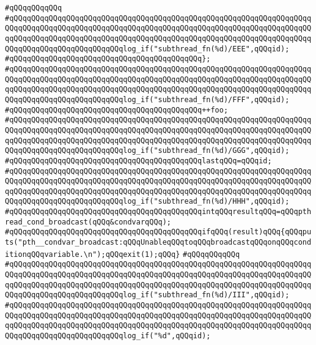 \verb|#qQQqqQQqqQQq|\newline
\verb|#qQQqqQQqqQQqqQQqqQQqqQQqqQQqqQQqqQQqqQQqqQQqqQQqqQQqqQQqqQQqqQQqqQQqqQQqqQQqqQQqqQQqqQQqqQQqqQQqqQQqqQQqqQQqqQQqqQQqqQQqqQQqqQQqqQQqqQQqqQQqqQQqqQQqqQQqqQQqqQQqqQQqqQQqqQQqqQQqqQQqqQQqqQQqqQQqqQQqqQQqqQQqqQQqqQQqqQQqqQQqqQQqqQQqqQQqqQQqlog_if("subthread_fn(%d)/EEE",qQQqid);|\newline
\verb|#qQQqqQQqqQQqqQQqqQQqqQQqqQQqqQQqqQQqqQQqqQQq};|\newline
\verb|#qQQqqQQqqQQqqQQqqQQqqQQqqQQqqQQqqQQqqQQqqQQqqQQqqQQqqQQqqQQqqQQqqQQqqQQqqQQqqQQqqQQqqQQqqQQqqQQqqQQqqQQqqQQqqQQqqQQqqQQqqQQqqQQqqQQqqQQqqQQqqQQqqQQqqQQqqQQqqQQqqQQqqQQqqQQqqQQqqQQqqQQqqQQqqQQqqQQqqQQqqQQqqQQqqQQqqQQqqQQqqQQqqQQqqQQqqQQqlog_if("subthread_fn(%d)/FFF",qQQqid);|\newline
\verb|#qQQqqQQqqQQqqQQqqQQqqQQqqQQqqQQqqQQqqQQqqQQq++foo;|\newline
\verb|#qQQqqQQqqQQqqQQqqQQqqQQqqQQqqQQqqQQqqQQqqQQqqQQqqQQqqQQqqQQqqQQqqQQqqQQqqQQqqQQqqQQqqQQqqQQqqQQqqQQqqQQqqQQqqQQqqQQqqQQqqQQqqQQqqQQqqQQqqQQqqQQqqQQqqQQqqQQqqQQqqQQqqQQqqQQqqQQqqQQqqQQqqQQqqQQqqQQqqQQqqQQqqQQqqQQqqQQqqQQqqQQqqQQqqQQqqQQqlog_if("subthread_fn(%d)/GGG",qQQqid);|\newline
\verb|#qQQqqQQqqQQqqQQqqQQqqQQqqQQqqQQqqQQqqQQqqQQqlastqQQq=qQQqid;|\newline
\verb|#qQQqqQQqqQQqqQQqqQQqqQQqqQQqqQQqqQQqqQQqqQQqqQQqqQQqqQQqqQQqqQQqqQQqqQQqqQQqqQQqqQQqqQQqqQQqqQQqqQQqqQQqqQQqqQQqqQQqqQQqqQQqqQQqqQQqqQQqqQQqqQQqqQQqqQQqqQQqqQQqqQQqqQQqqQQqqQQqqQQqqQQqqQQqqQQqqQQqqQQqqQQqqQQqqQQqqQQqqQQqqQQqqQQqqQQqqQQqlog_if("subthread_fn(%d)/HHH",qQQqid);|\newline
\verb|#qQQqqQQqqQQqqQQqqQQqqQQqqQQqqQQqqQQqqQQqqQQqintqQQqresultqQQq=qQQqpthread_cond_broadcast(qQQq&condvarqQQq);|\newline
\verb|#qQQqqQQqqQQqqQQqqQQqqQQqqQQqqQQqqQQqqQQqqQQqifqQQq(result)qQQq{qQQqputs("pth__condvar_broadcast:qQQqUnableqQQqtoqQQqbroadcastqQQqonqQQqconditionqQQqvariable.\n");qQQqexit(1);qQQq}|\newline
\verb|#qQQqqQQqqQQq|\newline
\verb|#qQQqqQQqqQQqqQQqqQQqqQQqqQQqqQQqqQQqqQQqqQQqqQQqqQQqqQQqqQQqqQQqqQQqqQQqqQQqqQQqqQQqqQQqqQQqqQQqqQQqqQQqqQQqqQQqqQQqqQQqqQQqqQQqqQQqqQQqqQQqqQQqqQQqqQQqqQQqqQQqqQQqqQQqqQQqqQQqqQQqqQQqqQQqqQQqqQQqqQQqqQQqqQQqqQQqqQQqqQQqqQQqqQQqqQQqqQQqlog_if("subthread_fn(%d)/III",qQQqid);|\newline
\verb|#qQQqqQQqqQQqqQQqqQQqqQQqqQQqqQQqqQQqqQQqqQQqqQQqqQQqqQQqqQQqqQQqqQQqqQQqqQQqqQQqqQQqqQQqqQQqqQQqqQQqqQQqqQQqqQQqqQQqqQQqqQQqqQQqqQQqqQQqqQQqqQQqqQQqqQQqqQQqqQQqqQQqqQQqqQQqqQQqqQQqqQQqqQQqqQQqqQQqqQQqqQQqqQQqqQQqqQQqqQQqqQQqqQQqqQQqqQQqlog_if("%d",qQQqid);|\newline
